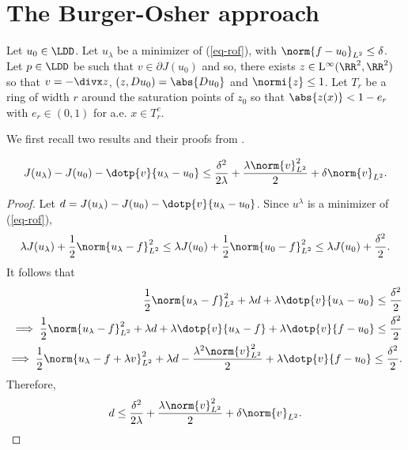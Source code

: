 
\section{The Burger-Osher approach}
\label{sec-burger-osher}



Let $u_0\in \LDD$.
Let $u_\lambda$ be a minimizer of (\ref{eq-rof}), with $\norm{ f -  u_0}_{L^2}\leq \delta$. Let $p\in \LDD$ be such that $v \in \partial J (u_0)$ and so, there exists $z\in \mathrm{L}^\infty(\RR^2, \RR^2)$ so that $v = -\divx z$, $(z, D u_0) = \abs{Du_0}$ and $\normi{z}\leq 1$. Let $T_r$ be a ring of width $r$ around the saturation points of $z_0$ so that $\abs{z(x)}<1- e_r$ with $e_r\in (0,1)$ for a.e. $x\in T_r^c$.


We first recall two results and their proofs from \cite{burger2004convergence}.


\begin{thm}\label{thm:burger}\cite{burger2004convergence}
$$
J(u_\lambda) - J(u_0) - \dotp{v}{u_\lambda-u_0}\leq \frac{\delta^2}{2\lambda} +\frac{\lambda  \norm{v}_{L^2}^2}{2} + \delta \norm{v}_{L^2}.
$$
\end{thm}
\begin{proof}
Let $d=  J(u_\lambda) -  J(u_0) - \dotp{v}{u_\lambda-u_0}$. Since $u^\lambda$ is a minimizer of (\ref{eq-rof}),
$$
\lambda J(u_\lambda) + \frac{1}{2}\norm{ u_\lambda - f}_{L^2}^2 \leq \lambda J(u_0) +  \frac{1}{2}\norm{ u_0 - f}_{L^2}^2\leq \lambda J(u_0) + \frac{\delta^2}{2}.$$
It follows that 
\begin{align*}
 \frac{1}{2}\norm{ u_\lambda - f}_{L^2}^2 +  \lambda d + \lambda \dotp{v}{u_\lambda - u_0} \leq \frac{\delta^2}{2}\\
\implies \frac{1}{2}\norm{ u_\lambda - f}_{L^2}^2 + \lambda d + \lambda \dotp{v}{ u_\lambda - f} + \lambda \dotp{v}{f -  u_0 } \leq \frac{\delta^2}{2}\\
\implies \frac{1}{2}\norm{ u_\lambda - f + \lambda v}_{L^2}^2 + \lambda d - \frac{\lambda^2 \norm{v}_{L^2}^2}{2} + \lambda \dotp{v}{f -  u_0 } \leq \frac{\delta^2}{2}.
\end{align*}
Therefore,
$$
d\leq \frac{\delta^2}{2\lambda} +\frac{\lambda  \norm{v}_{L^2}^2}{2} + \delta \norm{v}_{L^2} .
$$
\end{proof}




